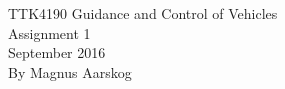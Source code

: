 \documentclass[12pt,a4paper]{article}	  %
\begin{document}
\begin{titlepage}
\begin{center}
\Large TTK4190 Guidance and Control of Vehicles \\
\vspace{10pt}
\Large Assignment 1 \\
\vspace{10pt}
\large September 2016 \\By Magnus Aarskog
\end{center}
\end{titlepage}




 \newpage
 


\end{document}
